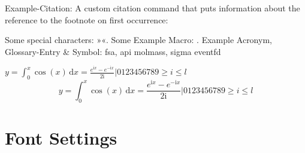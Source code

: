 %


\label{chap:chapter1}


Example-Citation:
\cite{DenKr_denkrement1_indeco}
\nl%
A custom citation command that puts information about the reference to the footnote on first occurrence:
%

\npi%
Some special characters:
»«.
\nl%
Some Example Macro:
.
\nl%
Example Acronym, Glossary-Entry \& Symbol:\nl
\gls{fsa}, \gls{api}\nl
\gls{molmass}, \gls{sigma}\nl
\gls{eventfd}

\np
\newcommand{\I}{\mathrm{i}}
$y = \int_0^x\cos(x)\,\mathrm{d}{x} = \frac{e^{\I x} - e^{-\I x}}{2\I} | 0123456789 \geq i \leqslant l$
\nl
\begin{equation}
y = \int_0^x\cos(x)\,\mathrm{d}{x} = \frac{e^{\I x} - e^{-\I x}}{2\I} | 0123456789 \geq i \leqslant l
\end{equation}







\section{Font Settings}

